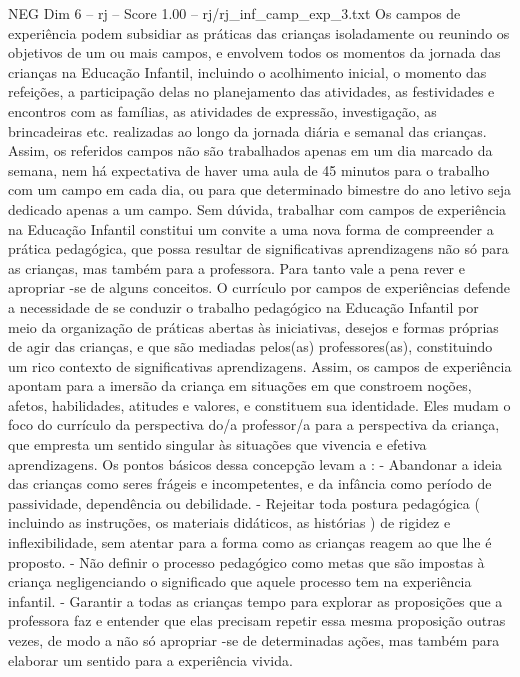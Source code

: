 \begin{textsample}{NEG Dim 6 – rj – Score 1.00 – rj/rj\_inf\_camp\_exp\_3.txt}  \label{ex:f6_neg_010}
Os campos de experiência podem subsidiar as práticas das crianças isoladamente ou reunindo os objetivos de um ou mais campos, e envolvem todos os momentos da jornada das crianças na Educação Infantil, incluindo o acolhimento inicial, o momento das refeições, a participação delas no planejamento das atividades, as festividades e encontros com as famílias, as atividades de expressão, investigação, as brincadeiras etc. realizadas ao longo da jornada diária e semanal das crianças.
Assim, os referidos campos não são trabalhados apenas em um dia marcado da semana, nem há expectativa de haver uma aula de 45 minutos para o trabalho com um campo em cada dia, ou para que determinado bimestre do ano letivo seja dedicado apenas a um campo.
Sem dúvida, trabalhar com campos de experiência na Educação Infantil constitui um convite a uma nova forma de compreender a prática pedagógica, que possa resultar de significativas aprendizagens não só para as crianças, mas também para a professora.
Para tanto vale a pena rever e apropriar -se de alguns conceitos.
O currículo por campos de experiências defende a necessidade de se conduzir o trabalho pedagógico na Educação Infantil por meio da organização de práticas abertas às iniciativas, desejos e formas próprias de agir das crianças, e que são mediadas pelos(as) professores(as), constituindo um rico contexto de significativas aprendizagens.
Assim, os campos de experiência apontam para a imersão da criança em situações em que constroem noções, afetos, habilidades, atitudes e valores, e constituem sua identidade.
Eles mudam o foco do currículo da perspectiva do/a professor/a para a perspectiva da criança, que empresta um sentido singular às situações que vivencia e efetiva aprendizagens.
Os pontos básicos dessa concepção levam a : - Abandonar a ideia das crianças como seres frágeis e incompetentes, e da infância como período de passividade, dependência ou debilidade. - Rejeitar toda postura pedagógica ( incluindo as instruções, os materiais didáticos, as histórias ) de rigidez e inflexibilidade, sem atentar para a forma como as crianças reagem ao que lhe é proposto. - Não definir o processo pedagógico como metas que são impostas à criança negligenciando o significado que aquele processo tem na experiência infantil. - Garantir a todas as crianças tempo para explorar as proposições que a professora faz e entender que elas precisam repetir essa mesma proposição outras vezes, de modo a não só apropriar -se de determinadas ações, mas também para elaborar um sentido para a experiência vivida.

\end{textsample}
